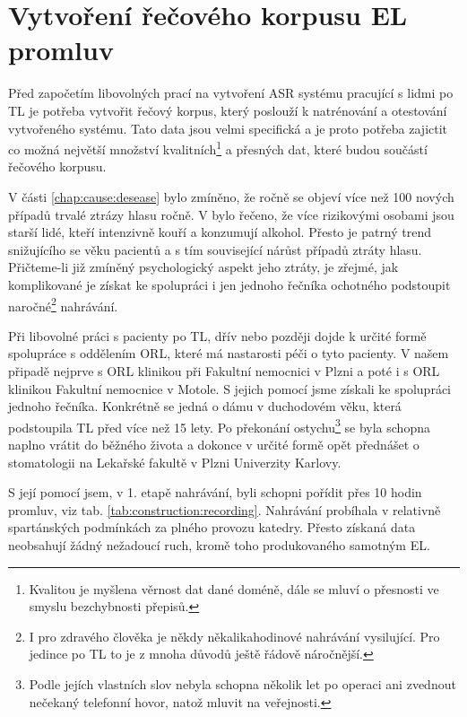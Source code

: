 \section{Vytvoření řečového korpusu EL promluv}
\label{chap:construction:corpus}

Před započetím libovolných prací na vytvoření ASR systému pracující s lidmi po TL je potřeba vytvořit řečový korpus, který poslouží k natrénování a otestování vytvořeného systému. Tato data jsou velmi specifická a je proto potřeba zajictit co možná největší množství kvalitních\footnote{Kvalitou je myšlena věrnost dat dané doméně, dále se mluví o přesnosti ve smyslu bezchybnosti přepisů.} a přesných dat, které budou součástí řečového korpusu.

V části \ref{chap:cause:desease} bylo zmíněno, že ročně se objeví více než 100 nových případů trvalé ztrázy hlasu ročně. V \cite{Skvrnakova2010} bylo řečeno, že více rizikovými osobami jsou starší lidé, kteří intenzivně kouří a konzumují alkohol. Přesto je patrný trend snižujícího se věku pacientů a s tím související nárůst případů ztráty hlasu. Přičteme-li již zmíněný psychologický aspekt jeho ztráty, je zřejmé, jak komplikované je získat ke spolupráci i jen jednoho řečníka ochotného podstoupit naročné\footnote{I pro zdravého člověka je někdy někalikahodinové nahrávání vysilující. Pro jedince po TL to je z mnoha důvodů ještě řádově náročnější.} nahrávání.

Při libovolné práci s pacienty po TL, dřív nebo později dojde k určité formě spolupráce s oddělením ORL, které má nastarosti péči o tyto pacienty. V našem připadě nejprve s ORL klinikou při Fakultní nemocnici v Plzni a poté i s ORL klinikou Fakultní nemocnice v Motole. S jejich pomocí jsme získali ke spolupráci jednoho řečníka. Konkrétně se jedná o dámu v duchodovém věku, která podstoupila TL před více než 15 lety. Po překonání ostychu\footnote{Podle jejích vlastních slov nebyla schopna několik let po operaci ani zvednout nečekaný telefonní hovor, natož mluvit na veřejnosti.} se byla schopna naplno vrátit do běžného života a dokonce v určité formě opět přednášet o stomatologii na Lekařské fakultě v Plzni Univerzity Karlovy.

S její pomocí jsem, v 1. etapě nahrávání, byli schopni pořídit přes 10 hodin promluv, viz tab. \ref{tab:construction:recording}. Nahrávání probíhala v relativně spartánských podmínkách za plného provozu katedry. Přesto získaná data neobsahují žádný nežadoucí ruch, kromě toho produkovaného samotným EL.

